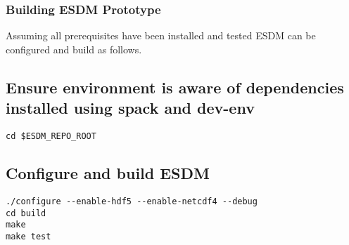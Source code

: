 \subsubsection{Building ESDM Prototype}%
\label{building-esdm-prototype}

Assuming all prerequisites have been installed and tested ESDM can be configured and build as follows.

\subsection{Ensure environment is aware of dependencies installed using spack and dev-env}%
\label{ensure-environment-is-aware-of-dependencies-installed-using-spack-and-dev-env-2}

\begin{lstlisting}
cd $ESDM_REPO_ROOT
\end{lstlisting}

\subsection{Configure and build ESDM}%
\label{configure-and-build-esdm}

\begin{lstlisting}
./configure --enable-hdf5 --enable-netcdf4 --debug
cd build
make
make test
\end{lstlisting}
